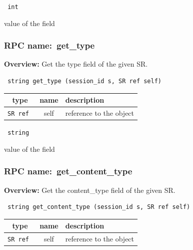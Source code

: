 \vspace{0.3cm}

{\tt 
int
}


value of the field
\vspace{0.3cm}
\vspace{0.3cm}
\vspace{0.3cm}
\subsubsection{RPC name:~get\_type}

{\bf Overview:} 
Get the type field of the given SR.

\begin{verbatim} string get_type (session_id s, SR ref self)\end{verbatim}



 
\vspace{0.3cm}
\begin{tabular}{|c|c|p{7cm}|}
 \hline
{\bf type} & {\bf name} & {\bf description} \\ \hline
{\tt SR ref } & self & reference to the object \\ \hline 

\end{tabular}

\vspace{0.3cm}

{\tt 
string
}


value of the field
\vspace{0.3cm}
\vspace{0.3cm}
\vspace{0.3cm}
\subsubsection{RPC name:~get\_content\_type}

{\bf Overview:} 
Get the content\_type field of the given SR.

\begin{verbatim} string get_content_type (session_id s, SR ref self)\end{verbatim}



 
\vspace{0.3cm}
\begin{tabular}{|c|c|p{7cm}|}
 \hline
{\bf type} & {\bf name} & {\bf description} \\ \hline
{\tt SR ref } & self & reference to the object \\ \hline 

\end{tabular}

